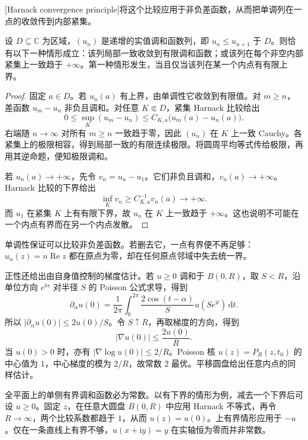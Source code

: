 [Harnack convergence principle]将这个比较应用于非负差函数，从而把单调列在一点的收敛传到内部紧集。

\begin{corollary}\label{b3:cor:15-harnack-convergence}
设 \(D\subseteq\mathbb C\) 为区域，\((u_n)\) 是递增的实值调和函数列，即 \(u_n\le u_{n+1}\) 于 \(D\)。则恰有以下一种情形成立：该列局部一致收敛到有限调和函数；或该列在每个非空内部紧集上一致趋于 \(+\infty\)。第一种情形发生，当且仅当该列在某一个内点有有限上界。
\end{corollary}
\begin{proof}
固定 \(a\in D\)。若 \(u_n(a)\) 有上界，由单调性它收敛到有限值。对 \(m\ge n\)，差函数 \(u_m-u_n\) 非负且调和。对任意 \(K\Subset D\)，紧集 Harnack 比较给出
\[
 0\le\sup_K(u_m-u_n)
 \le C_{K,a}\bigl(u_m(a)-u_n(a)\bigr).
\]
右端随 \(n\to\infty\) 对所有 \(m\ge n\) 一致趋于零，因此 \((u_n)\) 在 \(K\) 上一致 Cauchy。各紧集上的极限相容，得到局部一致的有限连续极限。将圆周平均等式传给极限，再用其逆命题，便知极限调和。

若 \(u_n(a)\to+\infty\)，先令 \(v_n=u_n-u_1\)。它们非负且调和，\(v_n(a)\to+\infty\)。Harnack 比较的下界给出
\[
 \inf_K v_n\ge C_{K,a}^{-1}v_n(a)\longrightarrow+\infty.
\]
而 \(u_1\) 在紧集 \(K\) 上有有限下界，故 \(u_n\) 在 \(K\) 上一致趋于 \(+\infty\)。这也说明不可能在一个内点有界而在另一个内点发散。
\end{proof}

单调性保证可以比较非负差函数。若删去它，一点有界便不再足够：\(u_n(z)=n\operatorname{Re}z\) 都在原点为零，却在任何原点邻域中失去统一界。

\ProseParagraphBreak
正性还给出由自身值控制的梯度估计。若 \(u\ge0\) 调和于 \(B(0,R)\)，取 \(S<R\)，沿单位方向 \(e^{\mathrm i\alpha}\) 对半径 \(S\) 的 Poisson 公式求导，得到
\[
 \partial_\alpha u(0)
 =\frac{1}{2\pi}\int_0^{2\pi}
 \frac{2\cos(t-\alpha)}S u(Se^{\mathrm i t})\,\mathrm dt.
\]
所以 \(|\partial_\alpha u(0)|\le2u(0)/S\)。令 \(S\uparrow R\)，再取梯度的方向，得到
\[
 |\nabla u(0)|\le\frac{2u(0)}R.
\]
当 \(u(0)>0\) 时，亦有 \(|\nabla\log u(0)|\le2/R\)。Poisson 核 \(u(z)=P_R(z,t_0)\) 的中心值为 \(1\)，中心梯度的模为 \(2/R\)，故常数 \(2\) 最优。平移圆盘给出任意内点的同样估计。

\ProseParagraphBreak
全平面上的单侧有界调和函数必为常数。以有下界的情形为例，减去一个下界后可设 \(u\ge0\)。固定 \(z\)，在任意大圆盘 \(B(0,R)\) 中应用 Harnack 不等式，再令 \(R\to\infty\)，两个比较系数都趋于 \(1\)，从而 \(u(z)=u(0)\)。上有界情形应用于 \(-u\)。仅在一条直线上有界不够，\(u(x+\mathrm i y)=y\) 在实轴恒为零而并非常数。


